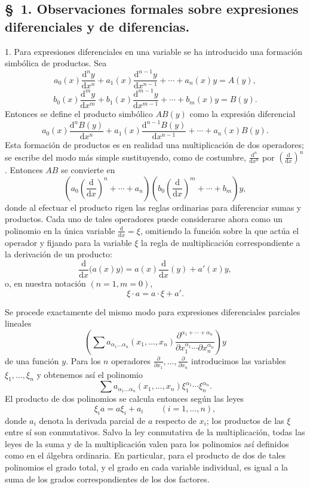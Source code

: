 \documentclass[11pt]{article}
\providecommand{\dd}{\mathrm d}
\providecommand{\p}{\partial}
\begin{document}
\subsection*{\S~1. Observaciones formales sobre expresiones diferenciales y de diferencias.}

1. Para expresiones diferenciales en una variable se ha introducido una formación simbólica de productos. Sea
\[
 a_0(x)\frac{\dd^n y}{\dd x^n}+a_1(x)\frac{\dd^{n-1}y}{\dd x^{n-1}}+\cdots+a_n(x)y=A(y),
\]
\[
 b_0(x)\frac{\dd^m y}{\dd x^m}+b_1(x)\frac{\dd^{m-1}y}{\dd x^{m-1}}+\cdots+b_m(x)y=B(y).
\]
Entonces se define el producto simbólico $AB(y)$ como la expresión diferencial
\[
 a_0(x)\frac{\dd^n B(y)}{\dd x^n}+a_1(x)\frac{\dd^{n-1}B(y)}{\dd x^{n-1}}+\cdots+a_n(x)B(y).
\]
Esta formación de productos es en realidad una multiplicación de dos operadores; se escribe del modo más simple sustituyendo, como de costumbre, $\frac{\dd^n}{\dd x^n}$ por $\left(\frac{\dd}{\dd x}\right)^n$. Entonces $AB$ se convierte en
\[
 \left(a_0\left(\frac{\dd}{\dd x}\right)^n+\cdots+a_n\right)
 \left(b_0\left(\frac{\dd}{\dd x}\right)^m+\cdots+b_m\right)y,
\]
donde al efectuar el producto rigen las reglas ordinarias para diferenciar sumas y productos. Cada uno de tales operadores puede considerarse ahora como un polinomio en la única variable $\frac{\dd}{\dd x}=\xi$, omitiendo la función sobre la que actúa el operador y fijando para la variable $\xi$ la regla de multiplicación correspondiente a la derivación de un producto:
\[
 \frac{\dd}{\dd x}\bigl(a(x)y\bigr)=a(x)\frac{\dd}{\dd x}(y)+a'(x)y,
\]
o, en nuestra notación $(n=1,m=0)$,
\begin{equation}
 \xi\cdot a=a\cdot\xi+a'.
\tag{1}
\end{equation}

Se procede exactamente del mismo modo para expresiones diferenciales parciales lineales
\[
 \left(\sum a_{\alpha_1\ldots\alpha_n}(x_1,\ldots,x_n)
 \frac{\p^{\alpha_1+\cdots+\alpha_n}}
 {\p x_1^{\alpha_1}\cdots\p x_n^{\alpha_n}}\right)y
\]
de una función $y$. Para los $n$ operadores $\frac{\p}{\p x_1},\ldots,\frac{\p}{\p x_n}$ introducimos las variables $\xi_1,\ldots,\xi_n$ y obtenemos así el polinomio
\[
 \sum a_{\alpha_1\ldots\alpha_n}(x_1,\ldots,x_n)
 \xi_1^{\alpha_1}\cdots\xi_n^{\alpha_n}.
\]
El producto de dos polinomios se calcula entonces según las leyes
\begin{equation}
 \xi_i a=a\xi_i+a_i \qquad (i=1,\ldots,n),
\tag{2}
\end{equation}
donde $a_i$ denota la derivada parcial de $a$ respecto de $x_i$; los productos de las $\xi$ entre sí son conmutativos. Salvo la ley conmutativa de la multiplicación, todas las leyes de la suma y de la multiplicación valen para los polinomios así definidos como en el álgebra ordinaria. En particular, para el producto de dos de tales polinomios el grado total, y el grado en cada variable individual, es igual a la suma de los grados correspondientes de los dos factores.
\end{document}
